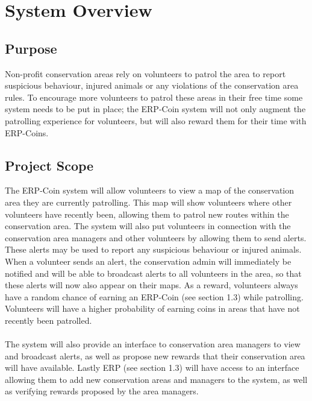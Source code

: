 \documentclass{article}
\begin{document}
\section{System Overview}

\subsection{Purpose}
Non-profit conservation areas rely on volunteers to patrol the area to report suspicious behaviour, injured animals or any violations of the conservation area rules. To encourage more volunteers to patrol these areas in their free time some system needs to be put in place; the ERP-Coin system will not only augment the patrolling experience for volunteers, but will also reward them for their time with ERP-Coins.
 
\subsection{Project Scope}
The ERP-Coin system will allow volunteers to view a map of the conservation area they are currently patrolling. This map will show volunteers where other volunteers have recently been, allowing them to patrol new routes within the conservation area. The system will also put volunteers in connection with the conservation area managers and other volunteers by allowing them to send alerts. These alerts may be used to report any suspicious behaviour or injured animals. When a volunteer sends an alert, the conservation admin will immediately be notified and will be able to broadcast alerts to all volunteers in the area, so that these alerts will now also appear on their maps. As a reward, volunteers always have a random chance of earning an ERP-Coin (see section 1.3) while patrolling. Volunteers will have a higher probability of earning coins in areas that have not recently been patrolled.\\\\The system will also provide an interface to conservation area managers to view and broadcast alerts, as well as propose new rewards that their conservation area will have available. Lastly ERP (see section 1.3) will have access to an interface allowing them to add new conservation areas and managers to the system, as well as verifying rewards proposed by the area managers.
\end{document}
